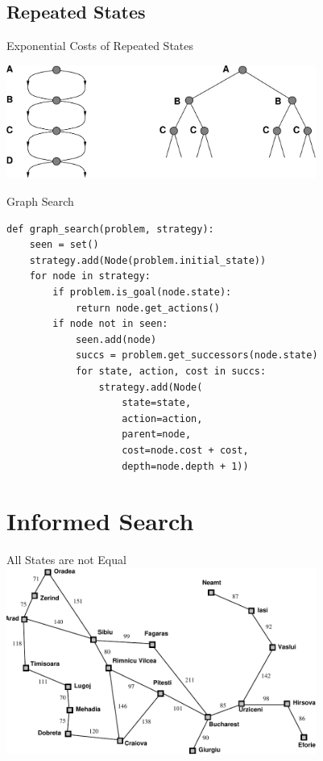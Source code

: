 \documentclass[14pt]{beamer}
\begin{document}
\subsection*{Repeated States}
\begin{frame}{Exponential Costs of Repeated States}
\begin{center}
\includegraphics[width=4in]{ribbon-space.pdf}
\end{center}
\end{frame}
\begin{frame}[fragile]{Graph Search}
\footnotesize
\begin{lstlisting}
def graph_search(problem, strategy):
    seen = set()
    strategy.add(Node(problem.initial_state))
    for node in strategy:
        if problem.is_goal(node.state):
            return node.get_actions()
        if node not in seen:
            seen.add(node)
            succs = problem.get_successors(node.state)
            for state, action, cost in succs:
                strategy.add(Node(
                    state=state,
                    action=action,
                    parent=node,
                    cost=node.cost + cost,
                    depth=node.depth + 1))
\end{lstlisting}
\end{frame}

\section{Informed Search}
\begin{frame}{All States are not Equal}
\includegraphics[width=4in]{romania-distances.pdf}
\end{frame}
\end{document}
